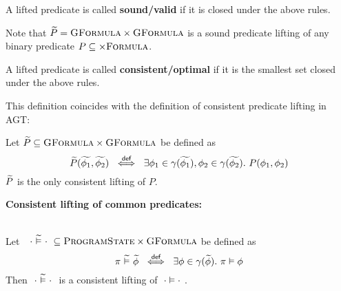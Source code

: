 \begin{definition}
    A lifted predicate is called \textbf{sound/valid} if it is closed under the above rules.
\end{definition}

Note that $\widetilde{P} = \textsc{GFormula} \times \textsc{GFormula}$ is a sound predicate lifting of any binary predicate $P \subseteq \times \textsc{Formula}$.

\begin{definition}
    A lifted predicate is called \textbf{consistent/optimal} if it is the smallest set closed under the above rules.
\end{definition}

This definition coincides with the definition of consistent predicate lifting in AGT:

\begin{lemma}\label{lemma:consistent-pred-lifting-direct}
    Let $\widetilde{P} \subseteq \textsc{GFormula} \times \textsc{GFormula}$ be defined as
    \begin{displaymath} 
    \widetilde{P}(\widetilde{\phi_1}, \widetilde{\phi_2}) ~\overset{\textsf{def}}{\iff}~ \exists \phi_1 \in \gamma(\widetilde{\phi_1}), \phi_2 \in \gamma(\widetilde{\phi_2}).~ P(\phi_1, \phi_2)
    \end{displaymath}
    $\widetilde{P}$ is the only consistent lifting of $P$.
\end{lemma} %



\textbf{Consistent lifting of common predicates:}

\begin{lemma}~\\
    Let $~~\cdot \,\,\widetilde{\vDash}\,\, \cdot~ \subseteq \textsc{ProgramState} \times \textsc{GFormula}$ be defined as
    \begin{displaymath} 
    \pi \,\,\widetilde{\vDash}\,\, \widetilde{\phi} ~\overset{\textsf{def}}{\iff}~ \exists \phi \in \gamma(\widetilde{\phi}).~ \pi \vDash \phi
    \end{displaymath}
    Then $~\cdot \,\,\widetilde{\vDash}\,\, \cdot~$ is a consistent lifting of $~\cdot \vDash \cdot~$.
\end{lemma}

